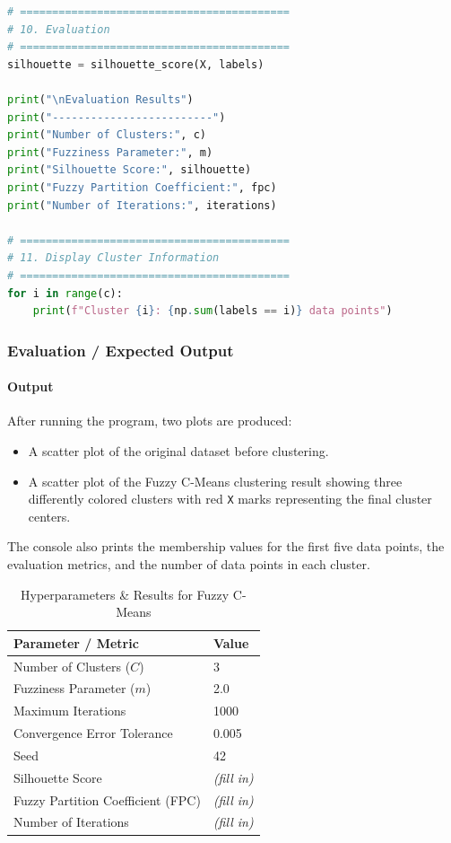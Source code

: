 \documentclass[a4paper,11pt]{article}
\begin{document}
\begin{lstlisting}[language=Python, caption={Fuzzy C-Means Clustering Implementation}]
# ==========================================
# 10. Evaluation
# ==========================================
silhouette = silhouette_score(X, labels)

print("\nEvaluation Results")
print("-------------------------")
print("Number of Clusters:", c)
print("Fuzziness Parameter:", m)
print("Silhouette Score:", silhouette)
print("Fuzzy Partition Coefficient:", fpc)
print("Number of Iterations:", iterations)

# ==========================================
# 11. Display Cluster Information
# ==========================================
for i in range(c):
    print(f"Cluster {i}: {np.sum(labels == i)} data points")
\end{lstlisting}

\subsubsection{Evaluation / Expected Output}

\paragraph{Output}
After running the program, two plots are produced:
\begin{itemize}
    \item A scatter plot of the original dataset before clustering.
    \item A scatter plot of the Fuzzy C-Means clustering result showing three differently colored clusters with red \texttt{X} marks representing the final cluster centers.
\end{itemize}
The console also prints the membership values for the first five data points, the evaluation metrics, and the number of data points in each cluster.

\begin{table}[H]
\centering
\caption{Hyperparameters \& Results for Fuzzy C-Means}
\begin{tabular}{ll}
\toprule
\textbf{Parameter / Metric} & \textbf{Value} \\
\midrule
Number of Clusters ($C$)             & 3 \\
Fuzziness Parameter ($m$)            & 2.0 \\
Maximum Iterations                   & 1000 \\
Convergence Error Tolerance          & 0.005 \\
Seed                                 & 42 \\
Silhouette Score                     & \textit{(fill in)} \\
Fuzzy Partition Coefficient (FPC)    & \textit{(fill in)} \\
Number of Iterations                 & \textit{(fill in)} \\
\bottomrule
\end{tabular}
\end{table}
\end{document}

